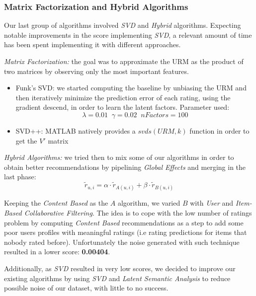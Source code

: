 \documentclass{acm_proc_article-sp}
\begin{document}
\subsubsection{Matrix Factorization and Hybrid Algorithms}
\label{subsec:hybrid}
Our last group of algorithms involved \textit{SVD} and \textit{Hybrid} algorithms. 
Expecting notable improvements in the score implementing \textit{SVD}, a relevant amount of time has been spent implementing it with different approaches. 

\textit{Matrix Factorization:} the goal was to approximate the URM as the product of two matrices by observing only the most important features.
\begin{itemize}
\item Funk's SVD: we started computing the baseline by unbiasing the URM and then iteratively minimize the prediction error of each rating, using the gradient descend, in order to learn the latent factors. Parameter used: \begin{equation}\lambda = 0.01 \;\; \gamma = 0.02 \;\;  nFactors = 100\end{equation}
\item SVD++: MATLAB natively provides a $svds(URM, k)$ function in order to get the $V'$ matrix 
\end{itemize}

\textit{Hybrid Algorithms:} we tried then to mix some of our algorithms in order to obtain better recommendations by pipelining \textit{Global Effects} and merging in the last phase: \begin{equation}\widetilde{r}_{u,i} = \alpha \cdot \widetilde{r}_{A(u,i)} + \beta \cdot \widetilde{r}_{B(u,i)}\end{equation}

Keeping the \textit{Content Based} as the $A$ algorithm, we varied $B$ with \textit{User} and \textit{Item-Based Collaborative Filtering}. 
The idea is to cope with the low number of ratings problem by computing \textit{Content Based} recommendations as a step to add some poor users profiles with meaningful ratings (i.e rating predictions for items that nobody rated before). Unfortunately the noise generated with such technique resulted in a lower score: \textbf{0.00404}.

Additionally, as \textit{SVD} resulted in very low scores, we decided to improve our existing algorithms by using \textit{SVD} and \textit{Latent Semantic Analysis} to reduce possible noise of our dataset, with little to no success.
\end{document}
